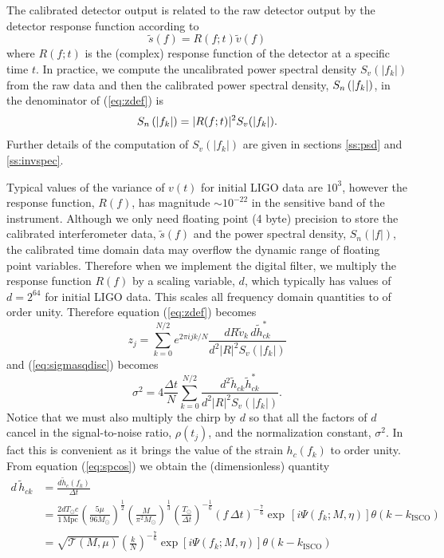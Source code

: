 The calibrated detector output is related to the raw detector output by the
detector response function according to
\begin{equation}
\tilde{s}(f) = R(f;t) \tilde{v}(f)
\end{equation}
where $R(f;t)$ is the (complex) response function of the detector at a
specific time $t$\cite{Adhikari:2003}. In practice, we compute the uncalibrated
power spectral density $S_v(|f_k|)$ from the raw data and then the calibrated
power spectral density, $S_n\left(\left|f_{k}\right|\right)$, in the denominator of (\ref{eq:zdef}) is
\begin{equation}
S_n\left(\left|f_{k}\right|\right) = |R(f;t)|^2 S_v(|f_k|).
\end{equation}
Further details of the computation of $S_v(|f_k|)$ are given in sections
\ref{ss:psd} and \ref{ss:invspec}.

Typical values of the variance of $v(t)$ for initial LIGO data are $10^3$,
however the response function, $R(f)$, has magnitude $\sim 10^{-22}$ in the
sensitive band of the instrument. Although we only need floating point (4
byte) precision to store the calibrated interferometer data, $\tilde{s}(f)$
and the power spectral density, $S_n(|f|)$, the calibrated time domain data may
overflow the dynamic range of floating point variables. Therefore when we
implement the digital filter, we multiply the response function $R(f)$ by a
scaling variable, $d$, which typically has values of $d = 2^{64}$ for initial
LIGO data. This scales all frequency domain quantities to of order  
unity.  Therefore equation (\ref{eq:zdef}) becomes
\begin{equation}
\label{eq:zdefcal}
z_j = \sum_{k=0}^{N/2} e^{2\pi ijk/N} 
  \frac{dR\tilde{v}_k\, d\tilde{h}_{ck}^\ast}
  {d^2|R|^2S_v\left(\left|f_k\right|\right)}
\end{equation}
and (\ref{eq:sigmasqdisc}) becomes
\begin{equation}
\label{eq:sigmasqdisccal}
\sigma^2 = 4 \frac{\Delta t}{N} \sum_{k=0}^{N/2}
\frac{d^2 \tilde{h}_{ck}\tilde{h}_{ck}^\ast}
{d^2|R|^2S_v\left(\left|f_k\right|\right)}. 
\end{equation}
Notice that we must also multiply the chirp by $d$ so that all the factors of
$d$ cancel in the signal-to-noise ratio, $\rho(t_j)$, and the normalization
constant, $\sigma^2$. In fact this is convenient as it brings the value of
the strain $h_c(f_k)$ to order unity. From equation (\ref{eq:spcos}) we obtain
the (dimensionless) quantity
\begin{equation}
\begin{split}
\label{eq:hck}
d\,\tilde{h}_{ck} &= \frac{d \tilde{h}_c(f_k)}{\Delta t} \\
&= 
\frac{2dT_\odot c}{1\,\mathrm{Mpc}}
\left(\frac{5\mu}{96M_\odot}\right)^\frac{1}{2}
\left(\frac{M}{\pi^2M_\odot}\right)^\frac{1}{3}
\left(\frac{T_\odot}{\Delta t}\right)^{-\frac{1}{6}}
\left( f\,\Delta t \right)^{-\frac{7}{6}}
\exp\,[i\Psi(f_k;M,\eta)] \theta\left(k-k_\mathrm{ISCO}\right)\\
&=
\sqrt{\mathcal{T}(M,\mu)}\left(\frac{k}{N}\right)^{-\frac{7}{6}}
\exp\left[i\Psi\left(f_k;M,\eta\right)\right] \theta\left(k-k_\mathrm{ISCO}\right)
\end{split}
\end{equation}
